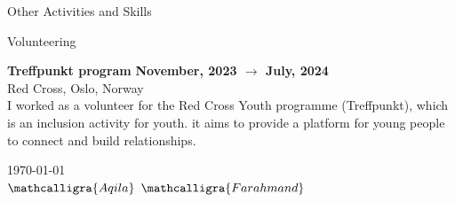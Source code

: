 \documentclass{resume} %
\begin{document}
\begin{rSection}{Other Activities and Skills}

        \begin{rSubsection2}{ Volunteering }

            \item\textbf{ Treffpunkt program }\hfill \textbf{November, 2023 $\rightarrow$ July, 2024}
            \\ Red Cross, Oslo, Norway
            \\ I worked as a volunteer for the Red Cross Youth programme (Treffpunkt), which is an inclusion activity for youth.
             it aims to provide a platform for young people to connect and build relationships.

        \end{rSubsection2}

    \end{rSection}
    
    \vspace{2em} %
    \begin{flushright}
        \today
        \\
        \vspace{1em}
        \Large$\mathcalligra{Aqila}$  $\mathcalligra{Farahmand}$

    \end{flushright}
    
\end{document}
